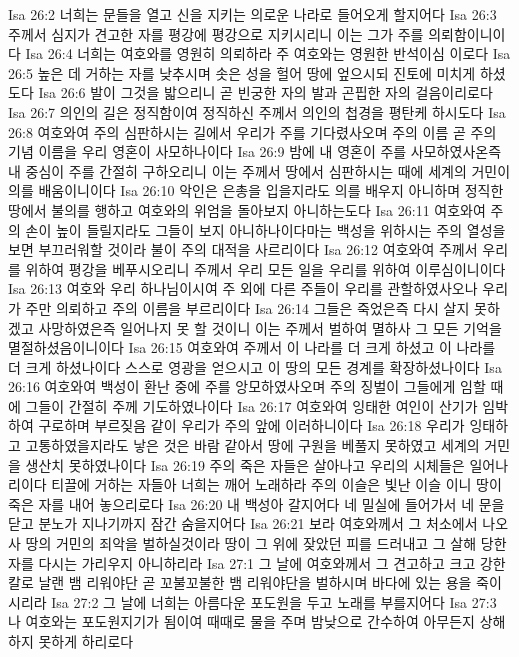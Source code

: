 Isa 26:2  너희는 문들을 열고 신을 지키는 의로운 나라로 들어오게 할지어다
Isa 26:3  주께서 심지가 견고한 자를 평강에 평강으로 지키시리니 이는 그가 주를 의뢰함이니이다
Isa 26:4  너희는 여호와를 영원히 의뢰하라 주 여호와는 영원한 반석이심 이로다
Isa 26:5  높은 데 거하는 자를 낮추시며 솟은 성을 헐어 땅에 엎으시되 진토에 미치게 하셨도다
Isa 26:6  발이 그것을 밟으리니 곧 빈궁한 자의 발과 곤핍한 자의 걸음이리로다
Isa 26:7  의인의 길은 정직함이여 정직하신 주께서 의인의 첩경을 평탄케 하시도다
Isa 26:8  여호와여 주의 심판하시는 길에서 우리가 주를 기다렸사오며 주의 이름 곧 주의 기념 이름을 우리 영혼이 사모하나이다
Isa 26:9  밤에 내 영혼이 주를 사모하였사온즉 내 중심이 주를 간절히 구하오리니 이는 주께서 땅에서 심판하시는 때에 세계의 거민이 의를 배움이니이다
Isa 26:10  악인은 은총을 입을지라도 의를 배우지 아니하며 정직한 땅에서 불의를 행하고 여호와의 위엄을 돌아보지 아니하는도다
Isa 26:11  여호와여 주의 손이 높이 들릴지라도 그들이 보지 아니하나이다마는 백성을 위하시는 주의 열성을 보면 부끄러워할 것이라 불이 주의 대적을 사르리이다
Isa 26:12  여호와여 주께서 우리를 위하여 평강을 베푸시오리니 주께서 우리 모든 일을 우리를 위하여 이루심이니이다
Isa 26:13  여호와 우리 하나님이시여 주 외에 다른 주들이 우리를 관할하였사오나 우리가 주만 의뢰하고 주의 이름을 부르리이다
Isa 26:14  그들은 죽었은즉 다시 살지 못하겠고 사망하였은즉 일어나지 못 할 것이니 이는 주께서 벌하여 멸하사 그 모든 기억을 멸절하셨음이니이다
Isa 26:15  여호와여 주께서 이 나라를 더 크게 하셨고 이 나라를 더 크게 하셨나이다 스스로 영광을 얻으시고 이 땅의 모든 경계를 확장하셨나이다
Isa 26:16  여호와여 백성이 환난 중에 주를 앙모하였사오며 주의 징벌이 그들에게 임할 때에 그들이 간절히 주께 기도하였나이다
Isa 26:17  여호와여 잉태한 여인이 산기가 임박하여 구로하며 부르짖음 같이 우리가 주의 앞에 이러하니이다
Isa 26:18  우리가 잉태하고 고통하였을지라도 낳은 것은 바람 같아서 땅에 구원을 베풀지 못하였고 세계의 거민을 생산치 못하였나이다
Isa 26:19  주의 죽은 자들은 살아나고 우리의 시체들은 일어나리이다 티끌에 거하는 자들아 너희는 깨어 노래하라 주의 이슬은 빛난 이슬 이니 땅이 죽은 자를 내어 놓으리로다
Isa 26:20  내 백성아 갈지어다 네 밀실에 들어가서 네 문을 닫고 분노가 지나기까지 잠간 숨을지어다
Isa 26:21  보라 여호와께서 그 처소에서 나오사 땅의 거민의 죄악을 벌하실것이라 땅이 그 위에 잦았던 피를 드러내고 그 살해 당한 자를 다시는 가리우지 아니하리라
Isa 27:1  그 날에 여호와께서 그 견고하고 크고 강한 칼로 날랜 뱀 리워야단 곧 꼬불꼬불한 뱀 리워야단을 벌하시며 바다에 있는 용을 죽이시리라
Isa 27:2  그 날에 너희는 아름다운 포도원을 두고 노래를 부를지어다
Isa 27:3  나 여호와는 포도원지기가 됨이여 때때로 물을 주며 밤낮으로 간수하여 아무든지 상해하지 못하게 하리로다

